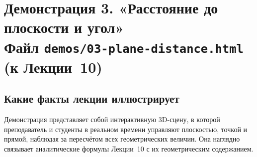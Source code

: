 \section*{Демонстрация 3. «Расстояние до плоскости и угол»\\ \normalsize\textmd{Файл \texttt{demos/03-plane-distance.html} \quad(к Лекции~10)}}

\subsection*{Какие факты лекции иллюстрирует}

Демонстрация представляет собой интерактивную 3D-сцену, в которой
преподаватель и студенты в реальном времени управляют плоскостью,
точкой и прямой, наблюдая за пересчётом всех геометрических величин.
Она наглядно связывает аналитические формулы Лекции~10 с их
геометрическим содержанием.

